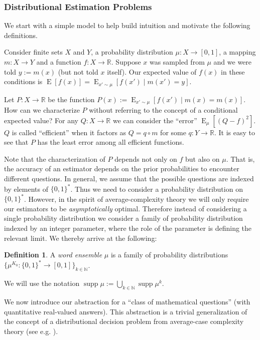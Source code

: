 \documentclass{article}
\numberwithin{equation}{section}
\theoremstyle{definition}
\newtheorem{definition}{Definition}[section]
\theoremstyle{plain}
\newcommand{\Bool}{\{0,1\}}
\newcommand{\Words}{{\Bool^*}}
\DeclareMathOperator{\Supp}{supp}
\DeclareMathOperator{\E}{E}
\newcommand{\Nats}{\mathbb{N}}
\newcommand{\Reals}{\mathbb{R}}
\begin{document}
\subsubsection{Distributional Estimation Problems}

We start with a simple model to help build intuition and motivate the following definitions.

Consider finite sets $X$ and $Y$, a probability distribution $\mu: X \rightarrow [0,1]$, a mapping $m: X \rightarrow Y$ and a function $f: X \rightarrow \Reals$. Suppose $x$ was sampled from $\mu$ and we were told $y := m(x)$ (but not told $x$ itself). Our expected value of $f(x)$ in these conditions is ${\E[f(x)] = \E_{x' \sim \mu}[f(x') \mid m(x') = y]}$.

Let $P: X \rightarrow \Reals$ be the function $P(x) := \E_{x' \sim \mu}[f(x') \mid m(x) = m(x)]$. How can we characterize $P$ without referring to the concept of a conditional expected value? For any $Q: X \rightarrow \Reals$ we can consider the \enquote{error} $\E_\mu[(Q - f)^2]$. $Q$ is called \enquote{efficient} when it factors as $Q = q \circ m$ for some $q: Y \rightarrow \Reals$. It is easy to see that $P$ has the least error among all efficient functions.

Note that the characterization of $P$ depends not only on $f$ but also on $\mu$. That is, the accuracy of an estimator depends on the prior probabilities to encounter different questions. In general, we assume that the possible questions are indexed by elements of $\Words$. Thus we need to consider a probability distribution on $\Words$. However, in the spirit of average-complexity theory we will only require our estimators to be \emph{asymptotically} optimal. Therefore instead of considering a single probability distribution we consider a family of probability distribution indexed by an integer parameter, where the role of the parameter is defining the relevant limit. We thereby arrive at the following:

\begin{definition}

A \emph{word ensemble} $\mu$ is a family of probability distributions ${\{\mu^{K_0}: \Words \rightarrow [0,1]\}_{k \in \Nats}}$.

We will use the notation $\Supp \mu := \bigcup_{k \in \Nats} \Supp \mu^k$.

\end{definition}

We now introduce our abstraction for a \enquote{class of mathematical questions} (with quantitative real-valued answers). This abstraction is a trivial generalization of the concept of a distributional decision problem from average-case complexity theory (see e.g. \cite{Bogdanov_2006}).
\end{document}
